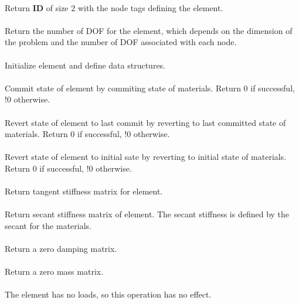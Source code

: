  \\
Return {\bf ID} of size $2$ with the node tags defining the element.
\\

 \\	
Return the number of DOF for the element, which depends on the dimension of the problem
and the number of DOF associated with each node.
\\

 \\
Initialize element and define data structures.
\\

 \\
Commit state of element by commiting state of materials.
Return 0 if successful, !0 otherwise.
\\

 \\        
Revert state of element to last commit by reverting to last committed state of materials.
Return 0 if successful, !0 otherwise.
\\

 \\        
Revert state of element to initial sate by reverting to initial state of materials.
Return 0 if successful, !0 otherwise.
\\

 \\
Return tangent stiffness matrix for element.
\\

 \\    
Return secant stiffness matrix of element.  The secant stiffness is
defined by the secant for the materials.
\\

 \\    
Return a zero damping matrix.
\\

 \\    
Return a zero mass matrix.
\\

 \\	
The element has no loads, so this operation has no effect.
\\


